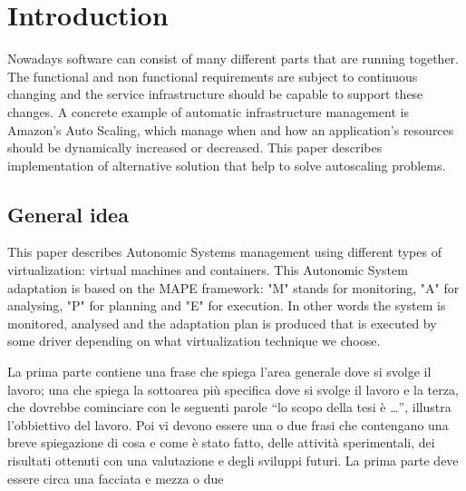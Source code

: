\chapter{Introduction}
\label{introduction}
\thispagestyle{empty}

\noindent
Nowadays software can consist of many different parts that are running together. The functional and non functional requirements are subject to continuous changing and the service infrastructure should be capable to support these changes. A concrete example of automatic infrastructure management is Amazon's Auto Scaling, which manage when and how an application's resources should be dynamically increased or decreased. This paper describes implementation of alternative solution that help to solve autoscaling problems.

\section{General idea}
\begin{sloppypar}This paper describes Autonomic Systems management using different types of virtualization: virtual machines and containers. This Autonomic System adaptation is based on the MAPE framework: "M" stands for monitoring, "A" for analysing, "P" for planning and "E" for execution. In other words the system is monitored, analysed and the adaptation plan is produced that is executed by some driver depending on what virtualization technique we choose.
\end{sloppypar}

\ifx La prima parte contiene una frase che spiega l'area generale dove si svolge il lavoro; una che spiega la sottoarea pi\`u specifica dove si svolge il lavoro e la terza, che dovrebbe cominciare con le seguenti parole ``lo scopo della tesi \`e \dots'', illustra l'obbiettivo del lavoro. Poi vi devono essere una o due frasi che contengano una breve spiegazione di cosa e come \`e stato fatto, delle attivit\`a sperimentali, dei risultati ottenuti con una valutazione e degli sviluppi futuri. La prima parte deve essere circa una facciata e mezza o due
\fi

